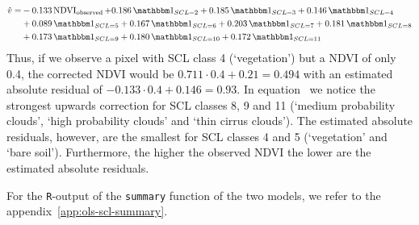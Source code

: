 	\begin{equation}\label{eq:corr_lm_res}
		\begin{aligned}		
			\hat v  = &
			-0.133 \operatorname{NDVI}_\text{observed}  
			+ 0.186 \, \mathbbm 1_{{SCL = 2}} 
			+ 0.185 \, \mathbbm 1_{{SCL = 3}} 
			+ 0.146 \, \mathbbm 1_{{SCL = 4}} \\ &
			+ 0.089 \, \mathbbm 1_{{SCL = 5}} 
			+ 0.167 \, \mathbbm 1_{{SCL = 6}} 
			+ 0.203 \, \mathbbm 1_{{SCL = 7}} 
			+ 0.181 \, \mathbbm 1_{{SCL = 8}} \\ & 
			+ 0.173 \, \mathbbm 1_{{SCL = 9}} 
			+ 0.180 \, \mathbbm 1_{{SCL = 10}} 
			+ 0.172 \, \mathbbm 1_{{SCL = 11}} 
		\end{aligned}
	\end{equation} 
	Thus, if we observe a pixel with SCL class 4 (`vegetation') but a NDVI of only 0.4, the corrected NDVI would be $0.711 \cdot 0.4 + 0.21 = 0.494$ with an estimated absolute residual of $-0.133 \cdot 0.4 + 0.146 = 0.93$.
	In equation~ we notice the strongest upwards correction for SCL classes 8, 9 and 11 (`medium probability clouds', `high probability clouds' and `thin cirrus clouds'). The estimated absolute residuals, however, are the smallest for SCL classes 4 and 5 (`vegetation' and `bare soil'). Furthermore, the higher the observed NDVI the lower are the estimated absolute residuals.

	For the \texttt{R}-output of the \texttt{summary} function of the two models, we refer to the appendix~\ref{app:ols-scl-summary}. 


	







